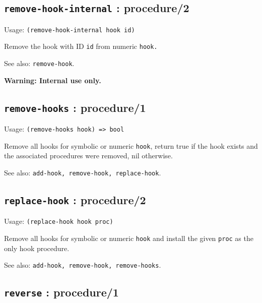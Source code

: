 \documentclass[
]{article}
\newcommand{\passthrough}[1]{#1}
\begin{document}
\hypertarget{remove-hook-internal-procedure2-1}{%
\subsection{\texorpdfstring{\texttt{remove-hook-internal} :
procedure/2}{remove-hook-internal : procedure/2}}\label{remove-hook-internal-procedure2-1}}

Usage: \passthrough{\lstinline!(remove-hook-internal hook id)!}

Remove the hook with ID \passthrough{\lstinline!id!} from numeric
\passthrough{\lstinline!hook.!}

See also: \passthrough{\lstinline!remove-hook!}.

\textbf{Warning: Internal use only.}

\hypertarget{remove-hooks-procedure1-1}{%
\subsection{\texorpdfstring{\texttt{remove-hooks} :
procedure/1}{remove-hooks : procedure/1}}\label{remove-hooks-procedure1-1}}

Usage: \passthrough{\lstinline!(remove-hooks hook) => bool!}

Remove all hooks for symbolic or numeric \passthrough{\lstinline!hook!},
return true if the hook exists and the associated procedures were
removed, nil otherwise.

See also: \passthrough{\lstinline!add-hook, remove-hook, replace-hook!}.

\hypertarget{replace-hook-procedure2-1}{%
\subsection{\texorpdfstring{\texttt{replace-hook} :
procedure/2}{replace-hook : procedure/2}}\label{replace-hook-procedure2-1}}

Usage: \passthrough{\lstinline!(replace-hook hook proc)!}

Remove all hooks for symbolic or numeric \passthrough{\lstinline!hook!}
and install the given \passthrough{\lstinline!proc!} as the only hook
procedure.

See also: \passthrough{\lstinline!add-hook, remove-hook, remove-hooks!}.

\hypertarget{reverse-procedure1-1}{%
\subsection{\texorpdfstring{\texttt{reverse} :
procedure/1}{reverse : procedure/1}}\label{reverse-procedure1-1}}
\end{document}
